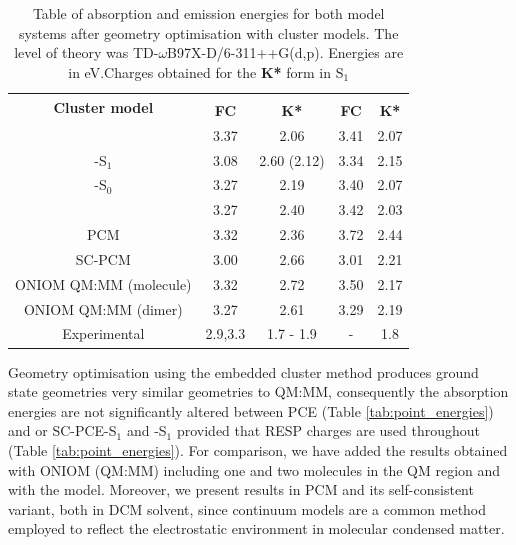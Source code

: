 \begin{table}[H]
\centering
\caption{Table of absorption and emission energies for both model systems after geometry optimisation with cluster models. The level of theory was TD-$\omega$B97X-D\slash{}6-311++G(d,p). Energies are in eV.\SP {$\dagger$}Charges obtained for the \textbf{K*} form in S$_1$}
\label{tab:em_abs}
\begin{tabular}{@{}ccccc@{}}


\toprule
\multirow{2}{*}{\textbf{Cluster model}}& \multicolumn{2}{c}{\HC{}}                 & \multicolumn{2}{c}{\HCC{}}   \\ \cmidrule(lr){2-3} \cmidrule(lr){4-5}
 & \multicolumn{1}{c}{\textbf{FC}}               & \multicolumn{1}{c}{\textbf{K*}}           & \multicolumn{1}{c}{\textbf{FC}}          & \multicolumn{1}{c}{\textbf{K*}}              \\ \midrule
\EEC{}
& 3.37 & 2.06 & 3.41 & 2.07 \\

\SCEEC{}-S$_1$
& 3.08 & 2.60 (2.12)\SP{$\dagger$} & 3.34 & 2.15 \\


\SCEEC{}-S$_0$
& 3.27 & 2.19 & 3.40 & 2.07 \\ \midrule

\EC{}
& 3.27 & 2.40 & 3.42 & 2.03 \\

PCM
& 3.32 & 2.36 & 3.72 & 2.44 \\ 
SC-PCM
& 3.00 & 2.66 & 3.01 & 2.21 \\
ONIOM QM:MM (molecule)\cite{Dommett2017c}
& 3.32 & 2.72 & 3.50 & 2.17 \\ 
ONIOM QM:MM (dimer) \cite{Dommett2017c}
& 3.27 & 2.61 & 3.29 & 2.19 \\\midrule\midrule
Experimental\cite{Zhang2015,Zahid2017}
& 2.9,3.3         & 1.7 - 1.9     &  -    & 1.8       \\ \bottomrule
\end{tabular}
\end{table}

 Geometry optimisation using the embedded cluster method produces ground state geometries very similar geometries to QM:MM, consequently the absorption energies are not significantly altered between PCE (Table \ref{tab:point_energies}) and \EEC{} or SC-PCE-S$_1$ and \SCEEC{}-S$_1$ provided that RESP charges are used throughout (Table \ref{tab:point_energies}). For comparison, we have added the results obtained with ONIOM (QM:MM) including one and two molecules in the QM region and with the \EC{} model. Moreover, we present results in PCM and its self-consistent variant, both in DCM solvent, since continuum models are a common method employed to reflect the electrostatic environment in molecular condensed matter.\cite{Skelton2015} 

